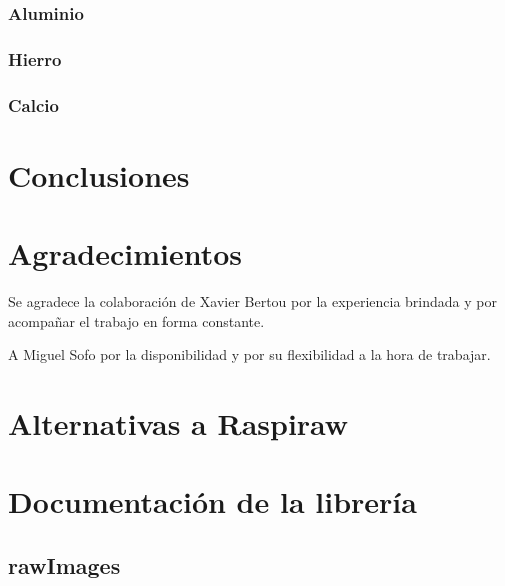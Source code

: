 \documentclass[twoside,twocolumn]{article}
\begin{document}
      \subsubsection{Aluminio}

      \subsubsection{Hierro}

      \subsubsection{Calcio}
    
  \section{Conclusiones}


  
  

  \section*{Agradecimientos}
    Se agradece la colaboración de Xavier Bertou por la experiencia brindada y por
    acompañar el trabajo en forma constante.

    A Miguel Sofo por la disponibilidad y por su flexibilidad a la hora de trabajar.
   
  \clearpage
  \appendix
  \section{Alternativas a Raspiraw}\label{sec:ap_alternatives}

  \section{Documentación de la librería}\label{sec:ap_doc}

    \subsection{rawImages}\label{sec:ap_doc:rawImages}
\end{document}
